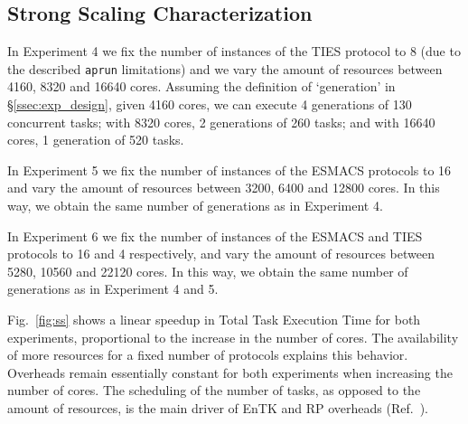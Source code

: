 \subsection{Strong Scaling Characterization}

In Experiment 4 we fix the number of instances of the TIES protocol to 8 (due
to the described \texttt{aprun} limitations) and we vary the amount of
resources between 4160, 8320 and 16640 cores. Assuming the definition of
`generation' in \S\ref{ssec:exp_design}, given 4160 cores, we can execute 4
generations of 130 concurrent tasks; with 8320 cores, 2 generations of 260
tasks; and with 16640 cores, 1 generation of 520 tasks.

In Experiment 5 we fix the number of instances of the ESMACS protocols to 16
and vary the amount of resources between 3200, 6400 and 12800 cores. In this
way, we obtain the same number of generations as in Experiment 4.

In Experiment 6 we fix the number of instances of the ESMACS and TIES
protocols to 16 and 4 respectively, and vary the amount of resources between
5280, 10560 and 22120 cores. In this way, we obtain the same number of
generations as in Experiment 4 and 5.

Fig.~\ref{fig:ss} shows a linear speedup in Total Task Execution Time for
both experiments, proportional to the increase in the number of cores. The
availability of more resources for a fixed number of protocols explains this
behavior. Overheads remain essentially constant for both experiments when
increasing the number of cores. The scheduling of the number of tasks, as
opposed to the amount of resources, is the main driver of EnTK and RP
overheads (Ref.~\cite{merzky2018}).


